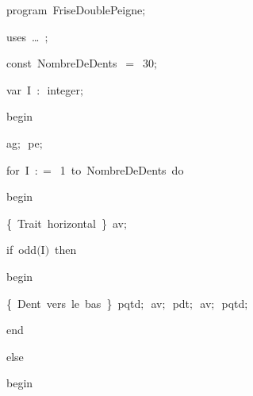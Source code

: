 
{
\parindent {}
\medskip

\carrenoir
\vspace{\neglskip}\mbox{\blc  \idt  \mcl program\idt\ FriseDoublePeigne$;$
}\par 
\vspace{\neglskip}\mbox{\blc \blk\idt \mcl uses\idt \ \ldots\ $;$
}\par 
\pagebreak[3] 
\vspace{\neglskip}\mbox{\blc  \blk\idt  \mcl const\idt \ NombreDeDents\ $=$\ 30$;$}\par 
\pagebreak[3] 
\vspace{\neglskip}\mbox{\blc  \blk\idt  \mcl var\idt \ I\ $:$\ integer$;$}\par 
\vspace{\neglskip}\mbox{\blc  \idt  \mcl begin\idt }\par 
\vspace{\neglskip}\mbox{\blc  \blk\idt  ag$;$\ pe$;$}\par 
\pagebreak[3] 
\vspace{\neglskip}\mbox{\blc  \blk\idt  \mcl for\idt \ I\ $:$$=$\ 1\ \mcl to\idt \ NombreDeDents\ \mcl do\idt }\par 
\vspace{\neglskip}\mbox{\blc  \blk\blk\idt  \mcl begin\idt }\par 
\vspace{\neglskip}\mbox{\blc  \blk\blk\blk\idt  \cmt  \{\ Trait\ horizontal\ \}\idt \ av$;$}\par 
\pagebreak[3] 
\vspace{\neglskip}\mbox{\blc  \blk\blk\blk\idt  \mcl if\idt \ odd$($I$)$\ \mcl then\idt }\par 
\vspace{\neglskip}\mbox{\blc  \blk\blk\blk\blk\idt  \mcl begin\idt }\par 
\vspace{\neglskip}\mbox{\blc  \blk\blk\blk\blk\blk\idt  \cmt  \{\ Dent\ vers\ le\ bas\ \}\idt \ pqtd$;$\ av$;$\ pdt$;$\ av$;$\ pqtd$;$\ }\par 
\vspace{\neglskip}\mbox{\blc  \blk\blk\blk\blk\idt  \mcl end\idt }\par 
\pagebreak[3] 
\vspace{\neglskip}\mbox{\blc  \blk\blk\blk\idt  \mcl else\idt }\par 
\vspace{\neglskip}\mbox{\blc  \blk\blk\blk\blk\idt  \mcl begin\idt }\par 
}
